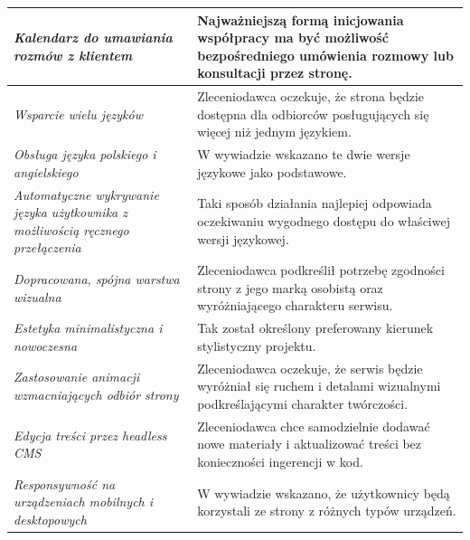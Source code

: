 \begin{longtable}{| p{} | p{} |}
\textit{Kalendarz do umawiania rozmów z klientem                                       } & Najważniejszą formą inicjowania współpracy ma być możliwość bezpośredniego umówienia rozmowy lub konsultacji przez stronę.                                      \\ \hline
\textit{Wsparcie wielu języków                                                         } & Zleceniodawca oczekuje, że strona będzie dostępna dla odbiorców posługujących się więcej niż jednym językiem.                                                   \\ \hline
\textit{Obsługa języka polskiego i angielskiego                                        } & W wywiadzie wskazano te dwie wersje językowe jako podstawowe.                                                                                                   \\ \hline
\textit{Automatyczne wykrywanie języka użytkownika z możliwością ręcznego przełączenia } & Taki sposób działania najlepiej odpowiada oczekiwaniu wygodnego dostępu do właściwej wersji językowej.                                                          \\ \hline
\textit{Dopracowana, spójna warstwa wizualna                                           } & Zleceniodawca podkreślił potrzebę zgodności strony z jego marką osobistą oraz wyróżniającego charakteru serwisu.                                                \\ \hline
\textit{Estetyka minimalistyczna i nowoczesna                                          } & Tak został określony preferowany kierunek stylistyczny projektu.                                                                                                \\ \hline
\textit{Zastosowanie animacji wzmacniających odbiór strony                             } & Zleceniodawca oczekuje, że serwis będzie wyróżniał się ruchem i detalami wizualnymi podkreślającymi charakter twórczości.                                       \\ \hline
\textit{Edycja treści przez headless CMS                                               } & Zleceniodawca chce samodzielnie dodawać nowe materiały i aktualizować treści bez konieczności ingerencji w kod.                                                 \\ \hline
\textit{Responsywność na urządzeniach mobilnych i desktopowych                         } & W wywiadzie wskazano, że użytkownicy będą korzystali ze strony z różnych typów urządzeń.                                                                        \\ \hline

\end{longtable}
